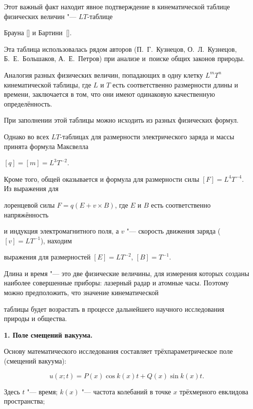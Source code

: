 Этот важный факт  находит явное подтверждение в кинематической таблице физических величин "--- $LT$-таблице 

Брауна [] и Бартини~[]. 

Эта таблица использовалась рядом авторов (П.~Г.~Кузнецов,  О.~Л.~Кузнецов, Б.~Е.~Большаков, А.~Е.~Петров) при анализе и~поиске общих законов природы.



Аналогия разных физических величин, попадающих в одну клетку $L^mT^n$ кинематической таблицы, где $L$ и $T$ есть соответственно размерности длины и времени, заключается в том, что они имеют одинаковую качественную определённость. 

При заполнении этой таблицы можно исходить из разных физических формул. 

Однако во всех  $LT$-таблицах для размерности электрического заряда и массы принята формула Максвелла 

$[q] = [m] = L^3T^{-2}.$

Кроме того, общей оказывается и формула для размерности силы $[F] = L^4T^{-4}$. Из выражения для

лоренцевой силы $F = q(E + v \times B)$, где  $E$ и $B$ есть соответственно напряжённость

и индукция электромагнитного поля, а $v$ "--- скорость движения заряда ($[v] = LT^{-1}$), находим

выражения для размерностей $[E] = LT^{-2}$, $[B] = T^{-1}$.



Длина и время "--- это две физические величины, для измерения которых созданы наиболее совершенные приборы: лазерный радар и атомные часы. Поэтому можно предположить, что значение кинематической 

таблицы будет возрастать в процессе дальнейшего научного исследования природы и общества.

 

 

\smallskip 



{\bf 1. Поле смещений вакуума.} 

Основу математического исследования составляет трёхпараметрическое поле (смещений вакуума):

$$

u(x;t) = P(x) \cos k(x)t + Q(x) \sin k(x)t.

$$ 

Здесь $t$ "--- время; $k(x)$ "--- частота колебаний в точке $x$ трёхмерного евклидова пространства; 

